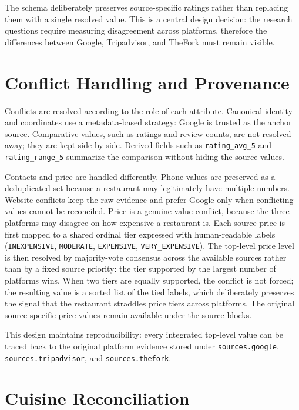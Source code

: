 The schema deliberately preserves source-specific ratings rather than replacing
them with a single resolved value. This is a central design decision: the research
questions require measuring disagreement across platforms, therefore the
differences between Google, Tripadvisor, and TheFork must remain visible.

\section{Conflict Handling and Provenance}

Conflicts are resolved according to the role of each attribute. Canonical identity
and coordinates use a metadata-based strategy: Google is trusted as the anchor
source. Comparative values, such as ratings and review counts, are not resolved
away; they are kept side by side. Derived fields such as \texttt{rating\_avg\_5}
and \texttt{rating\_range\_5} summarize the comparison without hiding the source
values.

Contacts and price are handled differently. Phone values are preserved as a
deduplicated set because a restaurant may legitimately have multiple numbers.
Website conflicts keep the raw evidence and prefer Google only when conflicting
values cannot be reconciled. Price is a genuine value conflict, because the three
platforms may disagree on how expensive a restaurant is. Each source price is first
mapped to a shared ordinal tier expressed with human-readable labels
(\texttt{INEXPENSIVE}, \texttt{MODERATE}, \texttt{EXPENSIVE},
\texttt{VERY\_EXPENSIVE}). The top-level price level is then resolved by
majority-vote consensus across the available sources rather than by a fixed source
priority: the tier supported by the largest number of platforms wins. When two
tiers are equally supported, the conflict is not forced; the resulting value is a
sorted list of the tied labels, which deliberately preserves the signal that the
restaurant straddles price tiers across platforms. The original source-specific
price values remain available under the source blocks.

This design maintains reproducibility: every integrated top-level value can be
traced back to the original platform evidence stored under
\texttt{sources.google}, \texttt{sources.tripadvisor}, and
\texttt{sources.thefork}.

\section{Cuisine Reconciliation}
\label{sec:cuisine-reconciliation}


